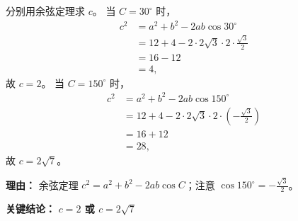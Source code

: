 \begin{examplebox}
\begin{description}[style=nextline, leftmargin=2.8em, labelsep=0.5em, itemsep=0.45em]
		\item[\textbf{第三步（分情况使用余弦定理）：}] 分别用余弦定理求 $c$。
			当 $C = 30^\circ$ 时，
			\[
				\begin{aligned}
					c^2 &= a^2 + b^2 - 2ab\cos30^\circ \\
					&= 12 + 4 - 2\cdot2\sqrt3\cdot2\cdot\frac{\sqrt3}{2} \\
					&= 16 - 12 \\
					&= 4 ,
			\end{aligned}
			\]
			故 $c = 2$。
			当 $C = 150^\circ$ 时，
			\[
				\begin{aligned}
					c^2 &= a^2 + b^2 - 2ab\cos150^\circ \\
					&= 12 + 4 - 2\cdot2\sqrt3\cdot2\cdot\left(-\frac{\sqrt3}{2}\right) \\
					&= 16 + 12 \\
					&= 28 ,
			\end{aligned}
			\]
			故 $c = 2\sqrt7$。
			\par\textbf{理由：}
			余弦定理 $c^2 = a^2+b^2-2ab\cos C$；注意 $\cos150^\circ = -\frac{\sqrt3}{2}$。
	\end{description}

	\textbf{\textcolor{CExample}{关键结论：}}
	\textbf{$c=2$ 或 $c=2\sqrt7$}
\end{examplebox}

